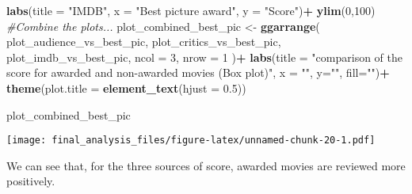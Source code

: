 \documentclass[]{article}
\newenvironment{Shaded}{\begin{snugshade}}{\end{snugshade}}
\newcommand{\KeywordTok}[1]{\textcolor[rgb]{0.13,0.29,0.53}{\textbf{#1}}}
\newcommand{\DataTypeTok}[1]{\textcolor[rgb]{0.13,0.29,0.53}{#1}}
\newcommand{\DecValTok}[1]{\textcolor[rgb]{0.00,0.00,0.81}{#1}}
\newcommand{\FloatTok}[1]{\textcolor[rgb]{0.00,0.00,0.81}{#1}}
\newcommand{\StringTok}[1]{\textcolor[rgb]{0.31,0.60,0.02}{#1}}
\newcommand{\CommentTok}[1]{\textcolor[rgb]{0.56,0.35,0.01}{\textit{#1}}}
\newcommand{\OperatorTok}[1]{\textcolor[rgb]{0.81,0.36,0.00}{\textbf{#1}}}
\newcommand{\NormalTok}[1]{#1}
\begin{document}
\begin{Shaded}
\begin{Highlighting}[]
\StringTok{  }\KeywordTok{labs}\NormalTok{(}\DataTypeTok{title =} \StringTok{"IMDB"}\NormalTok{, }\DataTypeTok{x =} \StringTok{"Best picture award"}\NormalTok{, }\DataTypeTok{y =} \StringTok{"Score"}\NormalTok{)}\OperatorTok{+}
\StringTok{  }\KeywordTok{ylim}\NormalTok{(}\DecValTok{0}\NormalTok{,}\DecValTok{100}\NormalTok{) }
\CommentTok{#Combine the plots...}
\NormalTok{plot_combined_best_pic <-}
\StringTok{  }\KeywordTok{ggarrange}\NormalTok{(}
\NormalTok{    plot_audience_vs_best_pic,}
\NormalTok{    plot_critics_vs_best_pic,}
\NormalTok{    plot_imdb_vs_best_pic,}
    \DataTypeTok{ncol =} \DecValTok{3}\NormalTok{,}
    \DataTypeTok{nrow =} \DecValTok{1}
\NormalTok{  )}\OperatorTok{+}
\StringTok{  }\KeywordTok{labs}\NormalTok{(}\DataTypeTok{title =} \StringTok{"comparison of the score for awarded and non-awarded movies (Box plot)"}\NormalTok{, }\DataTypeTok{x =} \StringTok{""}\NormalTok{, }\DataTypeTok{y=}\StringTok{""}\NormalTok{, }\DataTypeTok{fill=}\StringTok{""}\NormalTok{)}\OperatorTok{+}
\StringTok{  }\KeywordTok{theme}\NormalTok{(}\DataTypeTok{plot.title =} \KeywordTok{element_text}\NormalTok{(}\DataTypeTok{hjust =} \FloatTok{0.5}\NormalTok{))}

\NormalTok{plot_combined_best_pic}
\end{Highlighting}
\end{Shaded}

\texttt{[image: final\_analysis\_files/figure-latex/unnamed-chunk-20-1.pdf]}

We can see that, for the three sources of score, awarded movies are
reviewed more positively.
\end{document}
